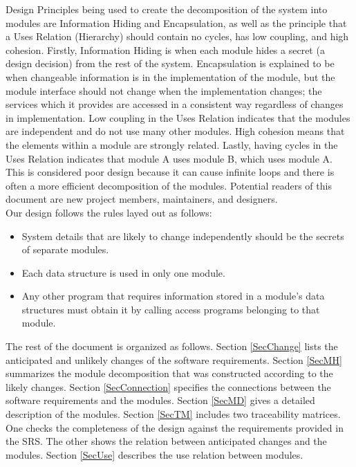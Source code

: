 \documentclass[12pt, titlepage]{article}
\begin{document}
\noindent Design Principles being used to create the decomposition of the system into modules are Information Hiding and Encapsulation, as well as the principle that a Uses Relation (Hierarchy) should contain no cycles, has low coupling, and high cohesion. Firstly, Information Hiding is when each module hides a secret (a design decision) from the rest of the system. Encapsulation is explained to be when changeable information is in the implementation of the module, but the module interface should not change when the implementation changes; the services which it provides are accessed in a consistent way regardless of changes in implementation. Low coupling in the Uses Relation indicates that the modules are independent and do not use many other modules. High cohesion means that the elements within a module are strongly related. Lastly, having cycles in the Uses Relation indicates that module A uses module B, which uses module A. This is considered poor design because it can cause infinite loops and there is often a more efficient decomposition of the modules. Potential readers of this document are new project members, maintainers, and designers.
\\ 

Our design follows the rules layed out as follows:
\begin{itemize}
\item System details that are likely to change independently should be the
  secrets of separate modules.
\item Each data structure is used in only one module.
\item Any other program that requires information stored in a module's data
  structures must obtain it by calling access programs belonging to that module.
\end{itemize}

The rest of the document is organized as follows. Section
\ref{SecChange} lists the anticipated and unlikely changes of the software
requirements. Section \ref{SecMH} summarizes the module decomposition that
was constructed according to the likely changes. Section \ref{SecConnection}
specifies the connections between the software requirements and the
modules. Section \ref{SecMD} gives a detailed description of the
modules. Section \ref{SecTM} includes two traceability matrices. One checks
the completeness of the design against the requirements provided in the SRS. The
other shows the relation between anticipated changes and the modules. Section
\ref{SecUse} describes the use relation between modules.
\end{document}
